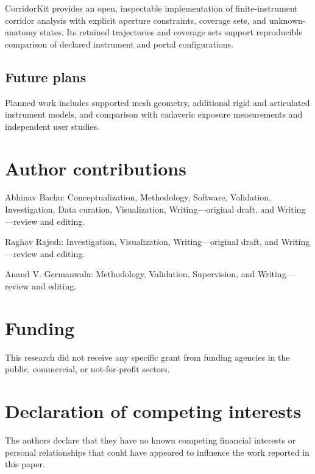 \documentclass[preprint,12pt]{elsarticle}
\begin{document}
CorridorKit provides an open, inspectable implementation of finite-instrument corridor analysis with explicit aperture constraints, coverage sets, and unknown-anatomy states. Its retained trajectories and coverage sets support reproducible comparison of declared instrument and portal configurations.

\subsection{Future plans}

Planned work includes supported mesh geometry, additional rigid and articulated instrument models, and comparison with cadaveric exposure measurements and independent user studies.

\section{Author contributions}

Abhinav Bachu: Conceptualization, Methodology, Software, Validation, Investigation, Data curation, Visualization, Writing---original draft, and Writing---review and editing.

Raghav Rajesh: Investigation, Visualization, Writing---original draft, and Writing---review and editing.

Anand V. Germanwala: Methodology, Validation, Supervision, and Writing---review and editing.

\section{Funding}

This research did not receive any specific grant from funding agencies in the public, commercial, or not-for-profit sectors.

\section{Declaration of competing interests}

The authors declare that they have no known competing financial interests or personal relationships that could have appeared to influence the work reported in this paper.




\end{document}
